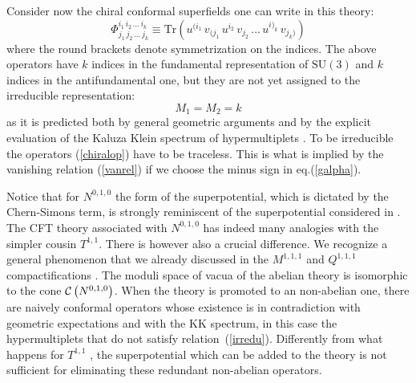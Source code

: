 \documentclass[a4paper,12pt]{article}
\def\n010{N^{0,1,0}}
\begin{document}
Consider now the chiral conformal superfields one can write in this
theory:
\begin{equation}
  \Phi^{i_1\, i_2 \, \dots \, i_k}_{j_1 \, j_2 \, \dots \, j_k}
  \equiv
  \mbox{Tr} \left( u^{(i_1} \, v_{(j_1} \, u^{i_2} \, v_{j_2} \, \dots
  \, u^{i)_k} \, v_{j_k)} \right)
\label{chiralop}
\end{equation}
where the round brackets denote symmetrization on the indices.
The above operators have $k$ indices in the fundamental
representation of $\mathrm{SU(3)}$ and $k$ indices in the antifundamental one,
but they are not yet assigned to the irreducible representation:
\begin{equation}
  M_1=M_2 = k
\label{irredu}
\end{equation}
as it is predicted both by general geometric arguments and by the
explicit evaluation of the Kaluza Klein spectrum of hypermultiplets
\cite{osp34}. To be irreducible the operators (\ref{chiralop}) have
to be traceless. This is what is implied by the vanishing relation
(\ref{vanrel}) if we choose the minus sign in eq.(\ref{galpha}).
\par
Notice that for $N^{0,1,0}$ the form of the superpotential, which is
dictated by the Chern-Simons term, is strongly reminiscent of the
superpotential considered in \cite{witkleb}.
The CFT theory associated with  $N^{0,1,0}$ has indeed many analogies
with the simpler cousin $T^{1,1}$.
There is however also a crucial difference.
We recognize a general phenomenon that we already discussed in the
$M^{1,1,1}$ and $Q^{1,1,1}$ compactifications \cite{3dcft}.
The moduli space of vacua of the abelian theory is isomorphic to the
cone ${\cal C}\left( \n010\right)$.
When the theory is promoted to an non-abelian one, there are naively
conformal operators whose existence is in contradiction with geometric
expectations and with the KK spectrum, in this case the hypermultiplets
that do not satisfy relation~(\ref{irredu}).
Differently from what happens for $T^{1,1}$ \cite{witkleb},
the superpotential which can be added to the theory is not sufficient
for eliminating these redundant non-abelian operators.
\end{document}
